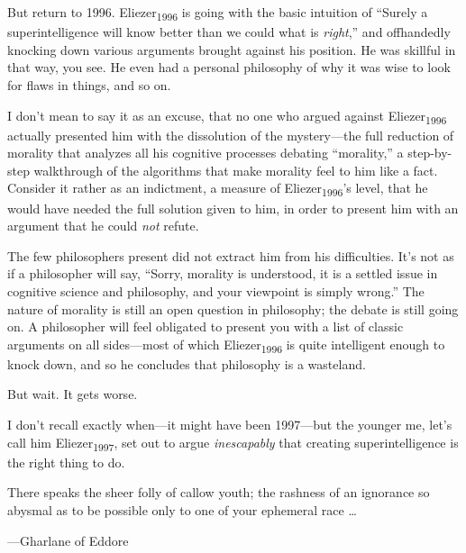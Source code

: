 {
 But return to 1996. Eliezer\textsubscript{1996} is going with the
basic intuition of ``Surely a superintelligence will
know better than we could what is \textit{right},''
and offhandedly knocking down various arguments brought against his
position. He was skillful in that way, you see. He even had a personal
philosophy of why it was wise to look for flaws in things, and so on.}

{
 I don't mean to say it as an excuse, that no one
who argued against Eliezer\textsubscript{1996} actually presented him
with the dissolution of the mystery---the full reduction of morality
that analyzes all his cognitive processes debating
``morality,'' a step-by-step
walkthrough of the algorithms that make morality feel to him like a
fact. Consider it rather as an indictment, a measure of
Eliezer\textsubscript{1996}'s level, that he would have
needed the full solution given to him, in order to present him with an
argument that he could \textit{not} refute.}

{
 The few philosophers present did not extract him from his
difficulties. It's not as if a philosopher will say,
``Sorry, morality is understood, it is a settled issue
in cognitive science and philosophy, and your viewpoint is simply
wrong.'' The nature of morality is still an open
question in philosophy; the debate is still going on. A philosopher
will feel obligated to present you with a list of classic arguments on
all sides---most of which Eliezer\textsubscript{1996} is quite
intelligent enough to knock down, and so he concludes that philosophy
is a wasteland.}

{
 But wait. It gets worse.}

{
 I don't recall exactly when---it might have been
1997---but the younger me, let's call him
Eliezer\textsubscript{1997}, set out to argue \textit{inescapably} that
creating superintelligence is the right thing to do.}

\myendsectiontext


{
 There speaks the sheer folly of callow youth; the rashness of an
ignorance so abysmal as to be possible only to one of your ephemeral
race \ldots}

{\raggedleft
 {}---Gharlane of Eddore
\par}


\bigskip

{
 ~}

